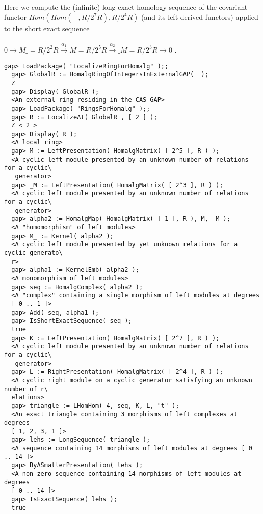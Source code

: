 \documentclass[a4paper,11pt]{report}
\begin{document}
{{ Here we compute the (infinite) long exact homology sequence of the covariant
functor $Hom(Hom(-,R/2^7R),R/2^4R)$ (and its left derived functors) applied to the short exact sequence\\
\\
 $0 \longrightarrow M\_=R/2^2R \stackrel{\alpha_1}{\longrightarrow} M=R/2^5R
\stackrel{\alpha_2}{\longrightarrow} \_M=R/2^3R \longrightarrow 0$ . 
\begin{Verbatim}[fontsize=\small,frame=single,label=Example]
  gap> LoadPackage( "LocalizeRingForHomalg" );;
  gap> GlobalR := HomalgRingOfIntegersInExternalGAP(  );
  Z
  gap> Display( GlobalR );
  <An external ring residing in the CAS GAP>
  gap> LoadPackage( "RingsForHomalg" );;
  gap> R := LocalizeAt( GlobalR , [ 2 ] );
  Z_< 2 >
  gap> Display( R );
  <A local ring>
  gap> M := LeftPresentation( HomalgMatrix( [ 2^5 ], R ) );
  <A cyclic left module presented by an unknown number of relations for a cyclic\
   generator>
  gap> _M := LeftPresentation( HomalgMatrix( [ 2^3 ], R ) );
  <A cyclic left module presented by an unknown number of relations for a cyclic\
   generator>
  gap> alpha2 := HomalgMap( HomalgMatrix( [ 1 ], R ), M, _M );
  <A "homomorphism" of left modules>
  gap> M_ := Kernel( alpha2 );
  <A cyclic left module presented by yet unknown relations for a cyclic generato\
  r>
  gap> alpha1 := KernelEmb( alpha2 );
  <A monomorphism of left modules>
  gap> seq := HomalgComplex( alpha2 );
  <A "complex" containing a single morphism of left modules at degrees
  [ 0 .. 1 ]>
  gap> Add( seq, alpha1 );
  gap> IsShortExactSequence( seq );
  true
  gap> K := LeftPresentation( HomalgMatrix( [ 2^7 ], R ) );
  <A cyclic left module presented by an unknown number of relations for a cyclic\
   generator>
  gap> L := RightPresentation( HomalgMatrix( [ 2^4 ], R ) );
  <A cyclic right module on a cyclic generator satisfying an unknown number of r\
  elations>
  gap> triangle := LHomHom( 4, seq, K, L, "t" );
  <An exact triangle containing 3 morphisms of left complexes at degrees
  [ 1, 2, 3, 1 ]>
  gap> lehs := LongSequence( triangle );
  <A sequence containing 14 morphisms of left modules at degrees [ 0 .. 14 ]>
  gap> ByASmallerPresentation( lehs );
  <A non-zero sequence containing 14 morphisms of left modules at degrees
  [ 0 .. 14 ]>
  gap> IsExactSequence( lehs );
  true
\end{Verbatim}
 }

 
}
\end{document}
